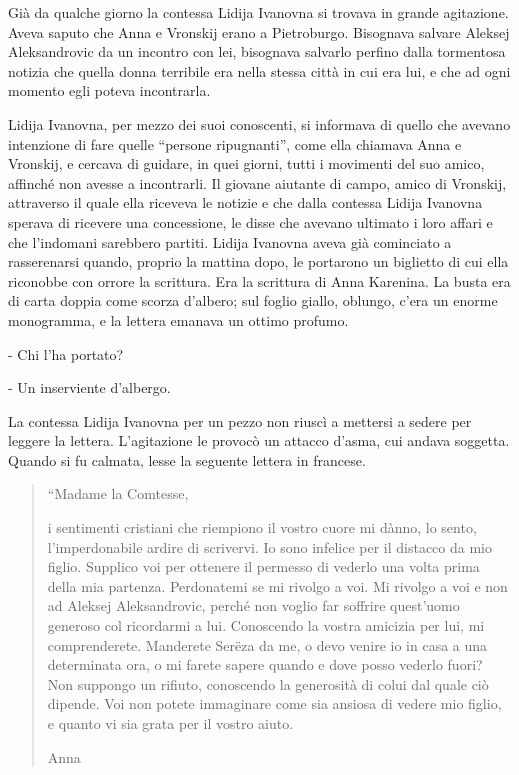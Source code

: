 Già da qualche giorno la contessa Lidija Ivanovna si trovava in grande agitazione. Aveva saputo che Anna e Vronskij erano a Pietroburgo. Bisognava salvare Aleksej Aleksandrovic da un incontro con lei, bisognava salvarlo perfino dalla tormentosa notizia che quella donna terribile era nella stessa città in cui era lui, e che ad ogni momento egli poteva incontrarla. 

Lidija Ivanovna, per mezzo dei suoi conoscenti, si informava di quello che avevano intenzione di fare quelle ``persone ripugnanti'', come ella chiamava Anna e Vronskij, e cercava di guidare, in quei giorni, tutti i movimenti del suo amico, affinché non avesse a incontrarli. Il giovane aiutante di campo, amico di Vronskij, attraverso il quale ella riceveva le notizie e che dalla contessa Lidija Ivanovna sperava di ricevere una concessione, le disse che avevano ultimato i loro affari e che l'indomani sarebbero partiti. Lidija Ivanovna aveva già cominciato a rasserenarsi quando, proprio la mattina dopo, le portarono un biglietto di cui ella riconobbe con orrore la scrittura. Era la scrittura di Anna Karenina. La busta era di carta doppia come scorza d'albero; sul foglio giallo, oblungo, c'era un enorme monogramma, e la lettera emanava un ottimo profumo. 

- Chi l'ha portato? 

- Un inserviente d'albergo. 

La contessa Lidija Ivanovna per un pezzo non riuscì a mettersi a sedere per leggere la lettera. L'agitazione le provocò un attacco d'asma, cui andava soggetta. Quando si fu calmata, lesse la seguente lettera in francese. 

\begin{quote}
``Madame la Comtesse, 

i sentimenti cristiani che riempiono il vostro cuore mi dànno, lo sento, l'imperdonabile ardire di scrivervi. Io sono infelice per il distacco da mio figlio. Supplico voi per ottenere il permesso di vederlo una volta prima della mia partenza. Perdonatemi se mi rivolgo a voi. Mi rivolgo a voi e non ad Aleksej Aleksandrovic, perché non voglio far soffrire quest'uomo generoso col ricordarmi a lui. Conoscendo la vostra amicizia per lui, mi comprenderete. Manderete Serëza da me, o devo venire io in casa a una determinata ora, o mi farete sapere quando e dove posso vederlo fuori? Non suppongo un rifiuto, conoscendo la generosità di colui dal quale ciò dipende. Voi non potete immaginare come sia ansiosa di vedere mio figlio, e quanto vi sia grata per il vostro aiuto. 

Anna
\end{quote}
\enlargethispage*{1\baselineskip}

